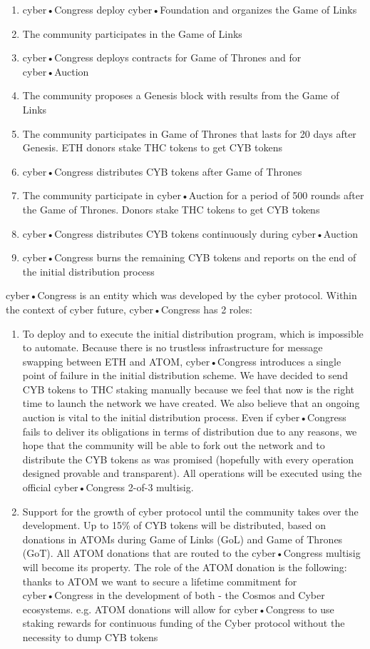 \documentclass[8pt,oneside]{amsart}
\begin{document}
\begin{enumerate}
 \item cyber•Congress deploy cyber•Foundation and organizes the Game of Links
 \item The community participates in the Game of Links
 \item cyber•Congress deploys contracts for Game of Thrones and for cyber•Auction
 \item The community proposes a Genesis block with results from the Game of Links
 \item The community participates in Game of Thrones that lasts for 20 days after Genesis. ETH donors stake THC tokens to get CYB tokens
 \item cyber•Congress distributes CYB tokens after Game of Thrones
 \item The community participate in cyber•Auction for a period of 500 rounds after the Game of Thrones. Donors stake THC tokens to get CYB tokens
 \item cyber•Congress distributes CYB tokens continuously during cyber•Auction
 \item cyber•Congress burns the remaining CYB tokens and reports on the end of the initial distribution process
\end{enumerate}

cyber•Congress is an entity which was developed by the cyber protocol. Within the context of cyber future, cyber•Congress
has 2 roles:
\begin{enumerate}
 \item To deploy and to execute the initial distribution program, which is impossible to automate. Because there is no trustless infrastructure for message swapping between ETH and ATOM, cyber•Congress introduces a single point of failure in the initial distribution scheme. We have decided to send CYB tokens to THC staking manually because we feel that now is the
right time to launch the network we have created. We also believe that an ongoing auction is vital to the initial distribution process. Even if cyber•Congress fails to deliver its obligations in terms of distribution due to any reasons, we hope that the community will be able to fork out the network and to distribute the CYB tokens as was promised (hopefully with every operation designed provable and transparent). All operations will be executed using the official cyber•Congress 2-of-3 multisig.
 \item Support for the growth of cyber protocol until the community takes over the development. Up to 15\% of CYB tokens will be distributed, based on donations in ATOMs during Game of Links (GoL) and Game of Thrones (GoT). All ATOM donations
that are routed to the cyber•Congress multisig will become its property. The role of the ATOM donation is the following:
thanks to ATOM we want to secure a lifetime commitment for cyber•Congress in the development of both - the Cosmos
and Cyber ecosystems. e.g. ATOM donations will allow for cyber•Congress to use staking rewards for continuous funding
of the Cyber protocol without the necessity to dump CYB tokens
\end{enumerate}
\end{document}
